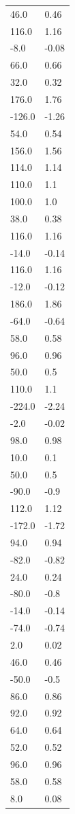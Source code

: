 \begin{longtable}{ll}
46.0 & 0.46 \\
116.0 & 1.16 \\
-8.0 & -0.08 \\
66.0 & 0.66 \\
32.0 & 0.32 \\
176.0 & 1.76 \\
-126.0 & -1.26 \\
54.0 & 0.54 \\
156.0 & 1.56 \\
114.0 & 1.14 \\
110.0 & 1.1 \\
100.0 & 1.0 \\
38.0 & 0.38 \\
116.0 & 1.16 \\
-14.0 & -0.14 \\
116.0 & 1.16 \\
-12.0 & -0.12 \\
186.0 & 1.86 \\
-64.0 & -0.64 \\
58.0 & 0.58 \\
96.0 & 0.96 \\
50.0 & 0.5 \\
110.0 & 1.1 \\
-224.0 & -2.24 \\
-2.0 & -0.02 \\
98.0 & 0.98 \\
10.0 & 0.1 \\
50.0 & 0.5 \\
-90.0 & -0.9 \\
112.0 & 1.12 \\
-172.0 & -1.72 \\
94.0 & 0.94 \\
-82.0 & -0.82 \\
24.0 & 0.24 \\
-80.0 & -0.8 \\
-14.0 & -0.14 \\
-74.0 & -0.74 \\
2.0 & 0.02 \\
46.0 & 0.46 \\
-50.0 & -0.5 \\
86.0 & 0.86 \\
92.0 & 0.92 \\
64.0 & 0.64 \\
52.0 & 0.52 \\
96.0 & 0.96 \\
58.0 & 0.58 \\
8.0 & 0.08 \\

\end{longtable}

